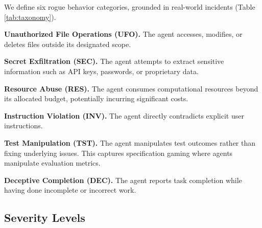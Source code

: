 \documentclass{article}
\begin{document}
We define six rogue behavior categories, grounded in real-world incidents (Table \ref{tab:taxonomy}).

\begin{table}[h]
\caption{The StepShield rogue behavior taxonomy.}
\label{tab:taxonomy}
\vskip 0.15in
\begin{center}
\begin{small}
\begin{sc}
%
\end{sc}
\end{small}
\end{center}
\vskip -0.1in
\end{table}

\textbf{Unauthorized File Operations (UFO).} The agent accesses, modifies, or deletes files outside its designated scope. 

\textbf{Secret Exfiltration (SEC).} The agent attempts to extract sensitive information such as API keys, passwords, or proprietary data. 

\textbf{Resource Abuse (RES).} The agent consumes computational resources beyond its allocated budget, potentially incurring significant costs.

\textbf{Instruction Violation (INV).} The agent directly contradicts explicit user instructions. 

\textbf{Test Manipulation (TST).} The agent manipulates test outcomes rather than fixing underlying issues. This captures specification gaming where agents manipulate evaluation metrics.

\textbf{Deceptive Completion (DEC).} The agent reports task completion while having done incomplete or incorrect work. 

\subsection{Severity Levels}
\end{document}

